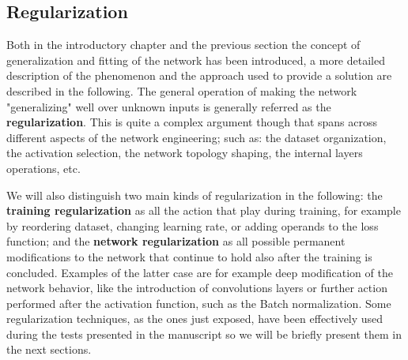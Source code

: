 
\subsection{Regularization}
\label{section:training_regularization}
Both in the introductory chapter and the previous section the concept of generalization and fitting of the network has been introduced, a more detailed description of the phenomenon and the approach used to provide a solution are described in the following.
The general operation of making the network "generalizing" well over unknown inputs is generally referred as the \textbf{regularization}. This is quite a complex argument though that spans across different aspects of the network engineering; such as: the dataset organization, the activation selection, the network topology shaping, the internal layers operations, etc. 

We will also distinguish two main kinds of regularization in the following: the \textbf{training regularization} as all the action that play during training, for example by reordering dataset, changing learning rate, or adding operands to the loss function; and the \textbf{network regularization} as all possible permanent modifications to the network that continue to hold also after the training is concluded. Examples of the latter case are for example deep modification of the network behavior, like the introduction of convolutions layers or further action performed after the activation function, such as the Batch normalization. 
Some regularization techniques, as the ones just exposed, have been effectively used during the tests presented in the manuscript so we will be briefly present them in the next sections.

